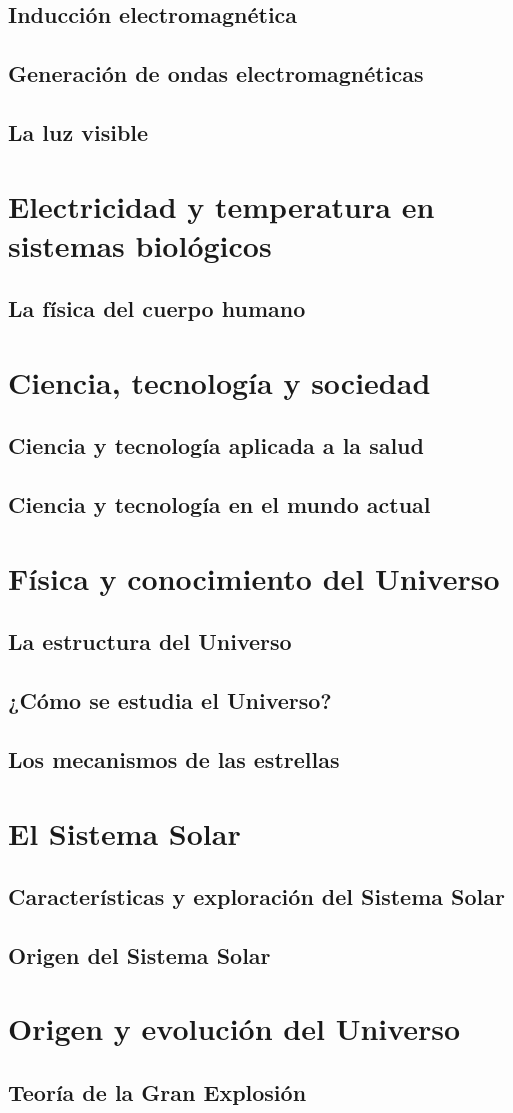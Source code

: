 \documentclass[11pt]{book}
\begin{document}
\subsection{Inducción electromagnética}
\subsection{Generación de ondas electromagnéticas}
\subsection{La luz visible}

\section{Electricidad y temperatura en sistemas biológicos}
\subsection{La física del cuerpo humano}

\section{Ciencia, tecnología y sociedad}
\subsection{Ciencia y tecnología aplicada a la salud}
\subsection{Ciencia y tecnología en el mundo actual}

\section{Física y conocimiento del Universo}
\subsection{La estructura del Universo}
\subsection{¿Cómo se estudia el Universo?}
\subsection{Los mecanismos de las estrellas}

\section{El Sistema Solar}
\subsection{Características y exploración del Sistema Solar}
\subsection{Origen del Sistema Solar}

\section{Origen y evolución del Universo}
\subsection{Teoría de la Gran Explosión}
\end{document}

